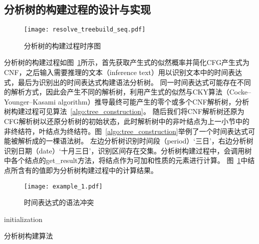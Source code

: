 \subsection{分析树的构建过程的设计与实现}

\begin{figure}[h]
    \centering
    \texttt{[image: resolve\_treebuild\_seq.pdf]}
    \caption{分析树的构建过程时序图}
    \label{fig:tree_construction}
\end{figure}

分析树的构建过程如图~\ref{fig:tree_construction}所示，首先获取产生式的似然概率并简化CFG产生式为CNF，之后输入需要推理的文本（inference text）用以识别文本中的时间表达式，最后为识别出的时间表达式构建语法分析树。
同一时间表达式可能存在不同的解析方式，因此会产生不同的解析树，利用产生式的似然与CKY算法（Cocke–Younger–Kasami algorithm）推导最终可能产生的零个或多个CNF解析树，分析树构建过程可见算法~\ref{algo:tree_construction}。
随后我们将CNF解析树还原为CFG解析树以还原分析树的初始状态，此时解析树中的非叶结点为上一小节中的非终结符，叶结点为终结符。图~\ref{algo:tree_construction}举例了一个时间表达式可能被解析成的一棵语法树。
左边分析树识别时间段（period）‘三日’，右边分析树识别日期（date）‘十月三日’，识别区间存在交集。分析树构建过程中，会调用树中各个结点的get\_result方法，将结点作为可加和性质的元素进行计算。
图~\ref{fig:tree_construction}中结点所含有的值即为分析树构建过程中的计算结果。

\begin{figure}[h]
    \centering
    \texttt{[image: example\_1.pdf]}
    \caption{时间表达式的语法冲突}
    \label{fig:example_1}
\end{figure}

\begin{algorithm}[h]
    \SetAlgoLined
    initialization\;
     {
    }
    \caption{分析树构建算法}
    \label{algo:tree_construction}
\end{algorithm}

